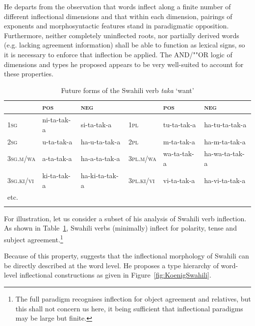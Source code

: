 \documentclass[output=paper
	        ,collection
	        ,collectionchapter
 	        ,biblatex
                ,babelshorthands
                ,newtxmath
                ,draftmode
                ,colorlinks, citecolor=brown
]{langscibook}
\begin{document}
He departs from the observation that words  inflect along a finite number
of different inflectional dimensions and that within each dimension,
pairings of exponents and morphosyntactic features stand in
paradigmatic opposition. Furthermore, neither completely uninflected
roots, nor partially derived words (e.g. lacking agreement
information) shall be able to function as lexical signs, so it is
necessary to enforce that inflection be applied. The AND/""OR
logic of dimensions and types he proposed appears to be very
well-suited to account for these properties. 

\begin{table}
\setlength{\tabcolsep}{.3em}
\centering
\begin{tabular}{llllll}
\lsptoprule 
 & \textsc{pos} & \textsc{neg}     &             & \textsc{pos} & \textsc{neg}\\
\midrule 
\textsc{1sg}       & ni-{ta}-tak-{a} & {si}-{ta}-tak-{a}    & \textsc{1pl} & tu-{ta}-tak-{a}     & {ha}-tu-{ta}-tak-{a}\\
\textsc{2sg}       & u-{ta}-tak-{a}  & {ha}-u-{ta}-tak-{a}  & \textsc{2pl} & m-{ta}-tak-{a}      & {ha}-m-{ta}-tak-{a}\\
\textsc{3sg.m/wa}  & a-{ta}-tak-{a}  & {ha}-a-{ta}-tak-{a}  & \textsc{3pl.m/wa} & wa-{ta}-tak-{a} & {ha}-wa-{ta}-tak-{a}\\ 
\textsc{3sg.ki/vi} & ki-{ta}-tak-{a} & {ha}-ki-{ta}-tak-{a} & \textsc{3pl.ki/vi} & vi-{ta}-tak-{a} & {ha}-vi-{ta}-tak-{a}\\
etc. & &\\
\lspbottomrule
\end{tabular}
\caption{Future forms of the Swahili verb  \textit{taka} ‘want’}
\label{tab:SwahiliPast}
\end{table}


For illustration, let us consider a subset of his analysis of Swahili
verb inflection. As shown in Table~\ref{tab:SwahiliPast}, Swahili
verbs (minimally) inflect for polarity, tense and subject
agreement.\footnote{The full paradigm recognises inflection for object
agreement and relatives, but this shall not concern us here, it being
sufficient that inflectional paradigms may be large but finite.} 

Because of this property, \citet[Section~5.5.2]{Koenig99} suggests
that the inflectional morphology of Swahili can be directly described
at the word level. He proposes a type hierarchy of word-level
inflectional constructions as given in Figure~\ref{fig:KoenigSwahili}.
\end{document}
